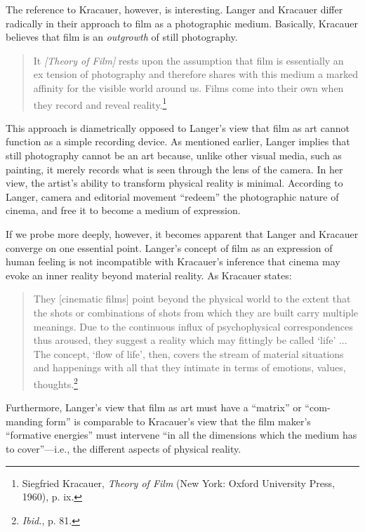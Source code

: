 \documentclass{tufte-handout}
\begin{document}
The reference to Kracauer, however, is interesting. Langer and Kracauer
differ radically in their approach to film as a photographic medium.
Basi­cally, Kracauer believes that film is an \emph{outgrowth} of still
photography.

\begin{quote}
It \emph{{[}Theory of Film{]}} rests upon the assumption that film is
essentially an ex­ tension of photography and therefore shares with this
medium a marked affinity for the visible world around us. Films come
into their own when they record and reveal reality.\footnote{Siegfried
  Kracauer, \emph{Theory of Film} (New York: Oxford University Press,
  1960), p. ix.}
\end{quote}

\noindent This approach is diametrically opposed to Langer's view that film as art
cannot function as a simple recording device. As mentioned earlier,
Langer implies that still photography cannot be an art because, unlike
other visual media, such as painting, it merely records what is seen
through the lens of the camera. In her view, the artist's ability to
transform physical reality is minimal. According to Langer, camera and
editorial movement ``redeem'' the photographic nature of cinema, and
free it to become a medium of ex­pression.

If we probe more deeply, however, it becomes apparent that Langer and
Kracauer converge on one essential point. Langer's concept of film as an
expression of human feeling is not incompatible with Kracauer's
inference that cinema may evoke an inner reality beyond material
reality. As Kra­cauer states:

\begin{quote}
They {[}cinematic films{]} point beyond the physical world to the extent
that the shots or combinations of shots from which they are built carry
multiple meanings. Due to the continuous influx of psychophysical
correspondences thus aroused, they suggest a reality which may fittingly
be called `life' ... The concept, `flow of life', then, covers the
stream of material situations and happenings with all that they intimate
in terms of emotions, values, thoughts.\footnote{\emph{Ibid.}, p. 81.}
\end{quote}

\noindent Furthermore, Langer's view that film as art must have a ``matrix'' or
``com­manding form'' is comparable to Kracauer's view that the film
maker's ``formative energies'' must intervene ``in all the dimensions
which the med­ium has to cover''---i.e., the different aspects of
physical reality.
\end{document}
